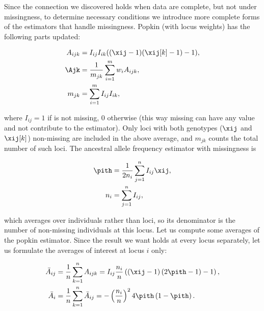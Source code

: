 \documentclass[11pt]{article}
\begin{document}
\begin{linenumbers}
\begin{appendices}
  Since the connection we discovered holds when data are complete, but not under missingness, to determine necessary conditions we introduce more complete forms of the estimators that handle missingness.
  Popkin (with locus weights) has the following parts updated:
  \begin{linenomath*}
  \begin{equation*}
    \begin{split}
      A_{ijk}
      &=
        I_{ij} I_{ik} ( (\xij-1)(\xij[k]-1) - 1 )
      , \\
      \Ajk
      &=
        \frac{1}{m_{jk}} \sum_{i=1}^m w_i A_{ijk}
        , \\
      m_{jk}
      &=
        \sum_{i=1}^m I_{ij} I_{ik}
        ,
    \end{split}
  \end{equation*}
  \end{linenomath*}
  where $I_{ij} = 1$ if \xij is not missing, 0 otherwise (this way missing \xij can have any value and not contribute to the estimator).
  Only loci with both genotypes ($\xij$ and $\xij[k]$) non-missing are included in the above average, and $m_{jk}$ counts the total number of such loci.
  The ancestral allele frequency estimator with missingness is
  \begin{linenomath*}
  \begin{align*}
    \pith
    &=
      \frac{1}{2 n_i} \sum_{j=1}^n I_{ij} \xij
      , \\
    n_i
    &=
      \sum_{j=1}^n I_{ij}
      ,
  \end{align*}
  \end{linenomath*}
  which averages over individuals rather than loci, so its denominator is the number of non-missing individuals at this locus.
  Let us compute some averages of the popkin estimator.
  Since the result we want holds at every locus separately, let us formulate the averages of interest at locus $i$ only:
  \begin{linenomath*}
  \begin{align*}
    \bar{A}_{ij}
    &=
      \frac{1}{n} \sum_{k=1}^n A_{ijk}
      =
      I_{ij} \frac{n_i}{n} \left( ( \xij - 1 ) \left( 2 \pith - 1 \right) - 1 \right)
      , \\
    \bar{A}_i
    &=
      \frac{1}{n} \sum_{k=1}^n \bar{A}_{ij}
      =
      - \left( \frac{n_i}{n} \right)^2 4 \pith \left( 1 - \pith \right)
      .
  \end{align*}
  \end{linenomath*}

\end{appendices}
\end{linenumbers}
\end{document}

